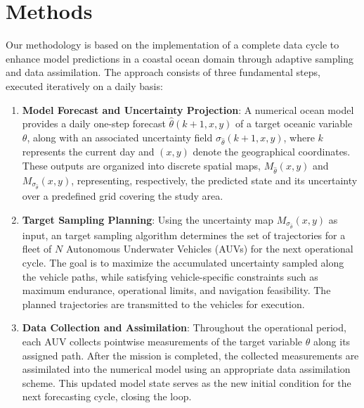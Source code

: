 
\section{Methods}

Our methodology is based on the implementation of a complete data cycle to enhance model predictions in a coastal ocean domain through adaptive sampling and data assimilation. The approach consists of three fundamental steps, executed iteratively on a daily basis:

\begin{enumerate}
    \item \textbf{Model Forecast and Uncertainty Projection}:  
    A numerical ocean model provides a daily one-step forecast $\hat{\theta}(k+1, x, y)$ of a target oceanic variable $\theta$, along with an associated uncertainty field $\sigma_{\hat{\theta}}(k+1, x, y)$, where $k$ represents the current day and $(x, y)$ denote the geographical coordinates. These outputs are organized into discrete spatial maps, $M_{\hat{\theta}}(x, y)$ and $M_{\sigma_{\hat{\theta}}}(x, y)$, representing, respectively, the predicted state and its uncertainty over a predefined grid covering the study area.
    
    \item \textbf{Target Sampling Planning}:  
    Using the uncertainty map $M_{\sigma_{\hat{\theta}}}(x, y)$ as input, an target sampling algorithm determines the set of trajectories for a fleet of $N$ Autonomous Underwater Vehicles (AUVs) for the next operational cycle. The goal is to maximize the accumulated uncertainty sampled along the vehicle paths, while satisfying vehicle-specific constraints such as maximum endurance, operational limits, and navigation feasibility. The planned trajectories are transmitted to the vehicles for execution.

    \item \textbf{Data Collection and Assimilation}:  
    Throughout the operational period, each AUV collects pointwise measurements of the target variable $\theta$ along its assigned path. After the mission is completed, the collected measurements are assimilated into the numerical model using an appropriate data assimilation scheme. This updated model state serves as the new initial condition for the next forecasting cycle, closing the loop.
\end{enumerate}

